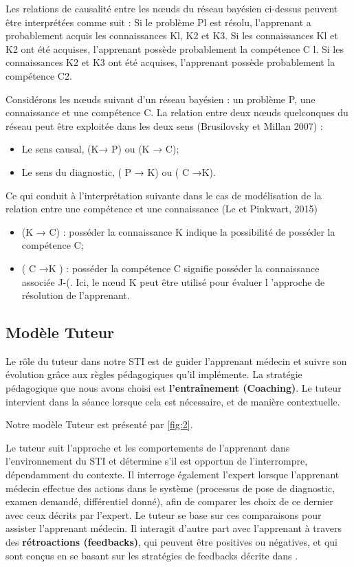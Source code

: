 Les relations de causalité entre les nœuds du réseau bayésien ci-dessus peuvent être interprétées comme suit : Si le problème Pl est résolu, l'apprenant a probablement acquis les connaissances Kl, K2 et K3. Si les connaissances Kl et K2 ont été acquises, l'apprenant possède probablement la compétence C l. Si les connaissances K2 et K3 ont été acquises, l'apprenant possède probablement la compétence C2. 

Considérons les nœuds suivant d'un réseau bayésien : un problème P, une connaissance et une compétence C. La relation entre deux nœuds quelconques du réseau peut être exploitée dans les deux sens (Brusilovsky et Millan 2007) : 
\begin{itemize}
\item Le sens causal, (K→ P) ou (K → C); 
\item Le sens du diagnostic, ( P → K) ou ( C →K). 
\end{itemize}

Ce qui conduit à l'interprétation suivante dans le cas de modélisation de la relation entre une compétence et une connaissance (Le et Pinkwart, 2015) 
\begin{itemize}
\item  (K → C) : posséder la connaissance K indique la possibilité de posséder la compétence C;
\item ( C →K ) : posséder la compétence C signifie posséder la connaissance associée J-(. Ici, le nœud K peut être utilisé pour évaluer l 'approche de résolution de l'apprenant.  
\end{itemize}


    \subsection{Modèle Tuteur}

Le rôle du tuteur dans notre STI est de guider l'apprenant médecin et suivre son évolution grâce aux règles pédagogiques qu'il implémente. La stratégie pédagogique que nous avons choisi est \textbf{l'entraînement (Coaching)}. Le tuteur intervient dans la séance lorsque cela est nécessaire, et de manière contextuelle.

Notre modèle Tuteur est présenté par \autoref{fig:2}.

Le tuteur suit l'approche et les comportements de l'apprenant dans l'environnement du STI et détermine s'il est opportun de l'interrompre, dépendamment du contexte. Il interroge également l'expert lorsque l'apprenant médecin effectue des actions dans le système (processus de pose de diagnostic, examen demandé, différentiel donné), afin de comparer les choix de ce dernier avec ceux décrits par l'expert. Le tuteur se base sur ces comparaisons pour assister l'apprenant médecin. Il interagit d'autre part avec l'apprenant à travers des \textbf{rétroactions (feedbacks)}, qui peuvent être positives ou négatives, et qui sont conçus en se basant sur les stratégies de feedbacks décrite dans \cite{narciss2008feedback}.

